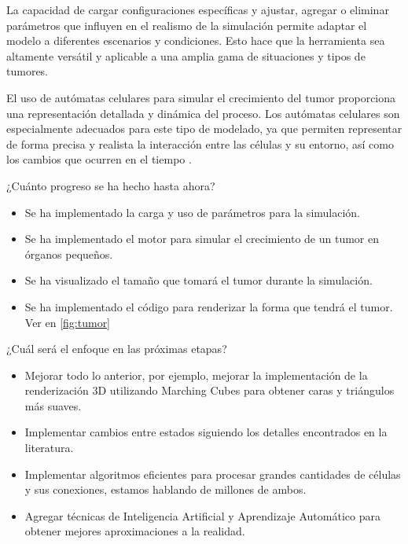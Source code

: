 \begin{conclusions}
La capacidad de cargar configuraciones específicas y ajustar, agregar o eliminar parámetros que influyen en el realismo de la simulación permite adaptar el modelo a diferentes escenarios y condiciones. Esto hace que la herramienta sea altamente versátil y aplicable a una amplia gama de situaciones y tipos de tumores.

El uso de autómatas celulares para simular el crecimiento del tumor proporciona una representación detallada y dinámica del proceso. Los autómatas celulares son especialmente adecuados para este tipo de modelado, ya que permiten representar de forma precisa y realista la interacción entre las células y su entorno, así como los cambios que ocurren en el tiempo \cite{book}.

¿Cuánto progreso se ha hecho hasta ahora?
\begin{itemize}
    \item Se ha implementado la carga y uso de parámetros para la simulación.
    \item Se ha implementado el motor para simular el crecimiento de un tumor en órganos pequeños. 
    \item Se ha visualizado el tamaño que tomará el tumor durante la simulación.
    \item Se ha implementado el código para renderizar la forma que tendrá el tumor. Ver en \ref{fig:tumor}
\end{itemize}

¿Cuál será el enfoque en las próximas etapas? 
\begin{itemize}
    \item Mejorar todo lo anterior, por ejemplo, mejorar la implementación de la renderización 3D utilizando Marching Cubes para obtener caras y triángulos más suaves.
    \item  Implementar cambios entre estados siguiendo los detalles encontrados en la literatura.
    \item Implementar algoritmos eficientes para procesar grandes cantidades de células y sus conexiones, estamos hablando de millones de ambos.
    \item Agregar técnicas de Inteligencia Artificial y Aprendizaje Automático para obtener mejores aproximaciones a la realidad.
\end{itemize}

\end{conclusions}

